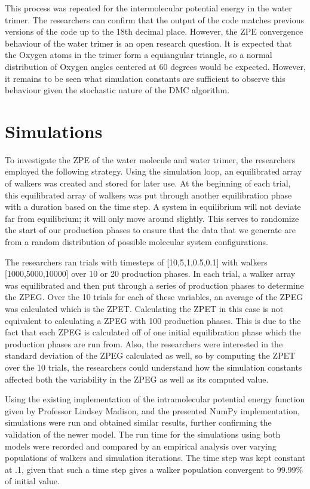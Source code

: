 \documentclass[journal=jacsat,manuscript=article]{achemso}
\begin{document}
This process was repeated for the intermolecular potential energy in the water trimer. The researchers can confirm that the output of the code matches previous versions of the code up to the 18th decimal place. However, the ZPE convergence behaviour of the water trimer is an open research question. It is expected that the Oxygen atoms in the trimer form a equiangular triangle, so a normal distribution of Oxygen angles centered at 60 degrees would be expected. However, it remains to be seen what simulation constants are sufficient to observe this behaviour given the stochastic nature of the DMC algorithm.

\section{Simulations}
To investigate the ZPE of the water molecule and water trimer, the researchers employed the following strategy. Using the simulation loop, an equilibrated array of walkers was created and stored for later use. At the beginning of each trial, this equilibrated array of walkers was put through another equilibration phase with a duration based on the time step. A system in equilibrium will not deviate far from equilibrium; it will only move around slightly. This serves to randomize the start of our production phases to ensure that the data that we generate are from a random distribution of possible molecular system configurations.

The researchers ran trials with timesteps of [10,5,1,0.5,0.1] with walkers [1000,5000,10000] over 10 or 20 production phases. In each trial, a walker array was equilibrated and then put through a series of production phases to determine the ZPEG. Over the 10 trials for each of these variables, an average of the ZPEG was calculated which is the ZPET. Calculating the ZPET in this case is not equivalent to calculating a ZPEG with 100 production phases. This is due to the fact that each ZPEG is calculated off of one initial equilibration phase which the production phases are run from. Also, the researchers were interested in the standard deviation of the ZPEG calculated as well, so by computing the ZPET over the 10 trials, the researchers could understand how the simulation constants affected both the variability in the ZPEG as well as its computed value.

Using the existing implementation of the intramolecular potential energy function given by Professor Lindsey Madison, and the presented NumPy implementation, simulations were run and obtained similar results, further confirming the validation of the newer model. The run time for the simulations using both models were recorded and compared by an empirical analysis over varying populations of walkers and simulation iterations. The time step was kept constant at .1, given that such a time step gives a walker population convergent to 99.99\% of initial value.
\end{document}

